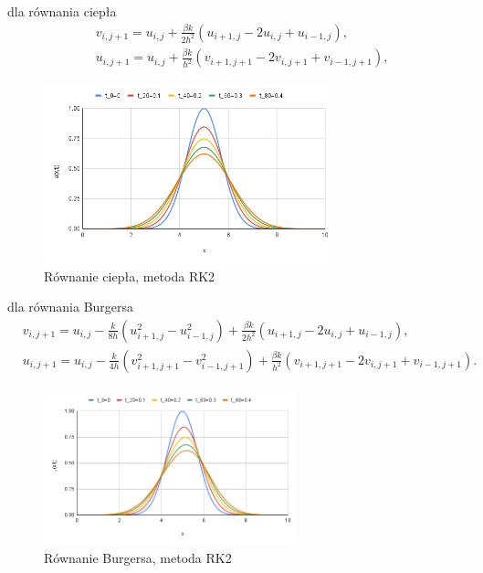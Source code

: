 \documentclass[12pt, a4paper]{article}
\begin{document}
dla równania ciepła
\begin{equation}
\begin{split}
& v_{i,j+1}=u_{i,j}+\frac{\beta k}{2h^{2}}(u_{i+1,j}-2u_{i,j}+u_{i-1,j}),\\
& u_{i,j+1}=u_{i,j}+\frac{\beta k}{h^{2}}(v_{i+1,j+1}-2v_{i,j+1}+v_{i-1,j+1}),
\end{split}
\end{equation}
\begin{figure}[h]
\caption{Równanie ciepła, metoda RK2}
\centering
\includegraphics[width=0.75\textwidth]{6}
\end{figure}

dla równania Burgersa
\begin{equation}
\begin{split}
& v_{i,j+1}=u_{i,j}-\frac{k}{8h}(u_{i+1,j}^{2}-u_{i-1,j}^{2})+\frac{\beta k}{2h^{2}}(u_{i+1,j}-2u_{i,j}+u_{i-1,j}),\\
& u_{i,j+1}=u_{i,j}-\frac{k}{4h}(v_{i+1,j+1}^{2}-v_{i-1,j+1}^{2})+\frac{\beta k}{h^{2}}(v_{i+1,j+1}-2v_{i,j+1}+v_{i-1,j+1}).
\end{split}
\end{equation}
\begin{figure}[h]
\caption{Równanie Burgersa, metoda RK2}
\centering
\includegraphics[width=0.65\textwidth]{7}
\end{figure}
\end{document}

